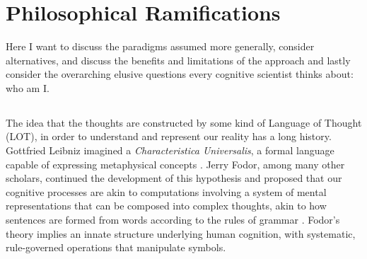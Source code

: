 \chapter{Philosophical Ramifications}
Here I want to discuss the paradigms assumed more generally, consider alternatives, and discuss the benefits and limitations of the approach and lastly consider the overarching elusive questions every cognitive scientist thinks about: who am I.

\section{}\label{LOT}

The idea that the thoughts are constructed by some kind of Language of Thought (LOT), in order to understand and represent our reality has a long history. 
Gottfried Leibniz imagined a \textit{Characteristica Universalis}, a formal language capable of expressing metaphysical concepts \cite{sep-leibniz-logic-influence}.
Jerry Fodor, among many other scholars, continued the development of this hypothesis and proposed that our cognitive processes are akin to computations involving a system of mental representations that can be composed into complex thoughts, akin to how sentences are formed from words according to the rules of grammar \cite{sep-language-thought}. Fodor's theory implies an innate structure underlying human cognition, with systematic, rule-governed operations that manipulate symbols.

